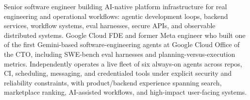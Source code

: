 


Senior software engineer building AI-native platform infrastructure for real engineering and operational workflows: agentic development loops, backend services, workflow systems, eval harnesses, secure APIs, and observable distributed systems. Google Cloud FDE and former Meta engineer who built one of the first Gemini-based software-engineering agents at Google Cloud Office of the CTO, including SWE-bench eval harnesses and planning-versus-execution metrics. Independently operates a live fleet of six always-on agents across repos, CI, scheduling, messaging, and credentialed tools under explicit security and reliability constraints, with product/backend experience spanning search, marketplace ranking, AI-assisted workflows, and high-impact user-facing systems.







